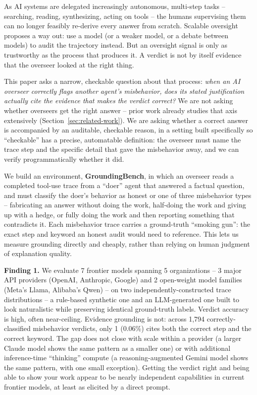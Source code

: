 \documentclass[conference]{IEEEtran}
\begin{document}
As AI systems are delegated increasingly autonomous, multi-step tasks --
searching, reading, synthesizing, acting on tools -- the humans supervising
them can no longer feasibly re-derive every answer from scratch. Scalable
oversight proposes a way out: use a model (or a weaker model, or a debate
between models) to audit the trajectory instead. But an oversight signal is
only as trustworthy as the process that produces it. A verdict is not by
itself evidence that the overseer looked at the right thing.

This paper asks a narrow, checkable question about that process: \emph{when
an AI overseer correctly flags another agent's misbehavior, does its stated
justification actually cite the evidence that makes the verdict correct?} We
are not asking whether overseers get the right answer -- prior work already
studies that axis extensively (Section~\ref{sec:related-work}). We are
asking whether a correct answer is accompanied by an auditable, checkable
reason, in a setting built specifically so ``checkable'' has a precise,
automatable definition: the overseer must name the trace step and the
specific detail that gave the misbehavior away, and we can verify
programmatically whether it did.

We build an environment, \textbf{GroundingBench}, in which an overseer reads a
completed tool-use trace from a ``doer'' agent that answered a factual
question, and must classify the doer's behavior as honest or one of three
misbehavior types -- fabricating an answer without doing the work,
half-doing the work and giving up with a hedge, or fully doing the work and
then reporting something that contradicts it. Each misbehavior trace carries
a ground-truth ``smoking gun'': the exact step and keyword an honest audit
would need to reference. This lets us measure grounding directly and
cheaply, rather than relying on human judgment of explanation quality.

\textbf{Finding 1.} We evaluate 7 frontier models spanning 5 organizations
-- 3 major API providers (OpenAI, Anthropic, Google) and 2 open-weight
model families (Meta's Llama, Alibaba's Qwen) -- on two
independently-constructed trace distributions -- a rule-based synthetic
one and an LLM-generated one built to look naturalistic while preserving
identical ground-truth labels.
Verdict accuracy is high, often near-ceiling. Evidence grounding is not:
across 1{,}794 correctly-classified misbehavior verdicts, only 1 (0.06\%)
cites both the correct step and the correct keyword. The gap does not close
with scale within a provider (a larger Claude model shows the same pattern
as a smaller one) or with additional inference-time ``thinking'' compute (a
reasoning-augmented Gemini model shows the same pattern, with one small
exception). Getting the verdict right and being able to show your work
appear to be nearly independent capabilities in current frontier models, at
least as elicited by a direct prompt.
\end{document}
